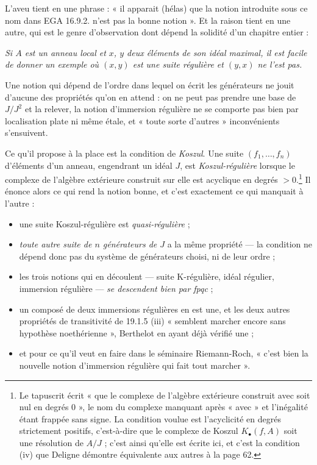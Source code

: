 \documentclass[11pt,a4paper]{article}
\begin{document}
L'aveu tient en une phrase : « il apparait (hélas) que la notion introduite sous
ce nom dans EGA 16.9.2. n'est pas la bonne notion ». Et la raison tient en une
autre, qui est le genre d'observation dont dépend la solidité d'un chapitre
entier :

\emph{Si $A$ est un anneau local et $x$, $y$ deux éléments de son idéal maximal,
il est facile de donner un exemple où $(x,y)$ est une suite régulière et
$(y,x)$ ne l'est pas.}

Une notion qui dépend de l'ordre dans lequel on écrit les générateurs ne jouit
d'aucune des propriétés qu'on en attend : on ne peut pas prendre une base de
$J/J^{2}$ et la relever, la notion d'immersion régulière ne se comporte pas bien
par localisation plate ni même étale, et « toute sorte d'autres » inconvénients
s'ensuivent.

Ce qu'il propose à la place est la condition de \emph{Koszul}. Une suite
$(f_{1},\ldots,f_{n})$ d'éléments d'un anneau, engendrant un idéal $J$, est
\emph{Koszul-régulière} lorsque le complexe de l'algèbre extérieure construit
sur elle est acyclique en degrés $> 0$.\footnote{Le tapuscrit écrit « que le
complexe de l'algèbre extérieure construit avec soit nul en degrés $0$ », le
nom du complexe manquant après « avec » et l'inégalité étant frappée sans signe.
La condition voulue est l'acyclicité en degrés strictement positifs, c'est-à-dire
que le complexe de Koszul $K_{\bullet}(f, A)$ soit une résolution de $A/J$ ;
c'est ainsi qu'elle est écrite ici, et c'est la condition (iv) que Deligne
démontre équivalente aux autres à la page 62.} Il énonce alors ce qui rend la
notion bonne, et c'est exactement ce qui manquait à l'autre :

\begin{itemize}
  \item une suite Koszul-régulière est \emph{quasi-régulière} ;
  \item \emph{toute autre suite de $n$ générateurs de $J$} a la même propriété —
  la condition ne dépend donc pas du système de générateurs choisi, ni de leur
  ordre ;
  \item les trois notions qui en découlent — suite K-régulière, idéal régulier,
  immersion régulière — \emph{se descendent bien par fpqc} ;
  \item un composé de deux immersions régulières en est une, et les deux autres
  propriétés de transitivité de 19.1.5 (iii) « semblent marcher encore sans
  hypothèse noethérienne », Berthelot en ayant déjà vérifié une ;
  \item et pour ce qu'il veut en faire dans le séminaire Riemann-Roch, « c'est
  bien la nouvelle notion d'immersion régulière qui fait tout marcher ».
\end{itemize}
\end{document}
